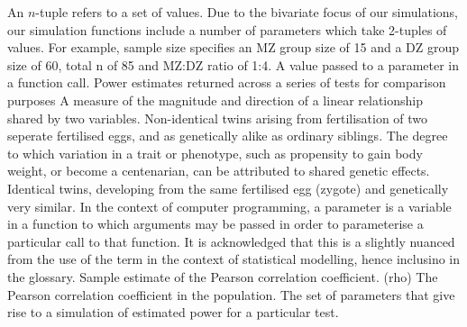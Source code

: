% 
% 
%

 An $n$-tuple refers to a set of values.  Due to the bivariate focus of our simulations, our simulation functions include a number of parameters which take 2-tuples of values.  For example, sample size  specifies an MZ group size of 15 and a DZ group size of 60, total n of 85 and MZ:DZ ratio of 1:4.
 A value passed to a parameter in a function call.
 Power estimates returned across a series of tests for comparison purposes
 A measure of the magnitude and direction of a linear relationship shared by two variables.
 Non-identical twins arising from fertilisation of two seperate fertilised eggs, and as genetically alike as ordinary siblings.
 The degree to which variation in a trait or phenotype, such as propensity to gain body weight, or become a centenarian, can be attributed to shared genetic effects.
 Identical twins, developing from the same fertilised egg (zygote) and genetically very similar.
 In the context of computer programming, a parameter is a variable in a function to which arguments may be passed in order to parameterise a particular call to that function.  It is acknowledged that this is a slightly nuanced from the use of the term in the context of statistical modelling, hence inclusino in the glossary.
 Sample estimate of the Pearson correlation coefficient.
\runinhead{$\rho$} (rho) The Pearson correlation coefficient in the population.
 The set of parameters that give rise to a simulation of estimated power for a particular test.

